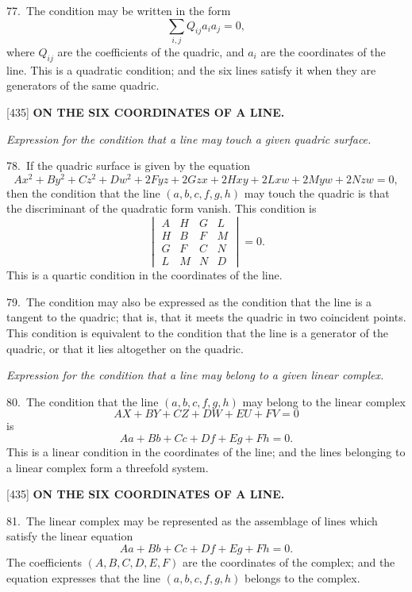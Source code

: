 \documentclass[12pt,a4paper]{article}
\newcommand{\paperref}[1]{\textup{[#1]}}
\theoremstyle{definition}
\begin{document}
77.~The condition may be written in the form
\[
\sum_{i,j} Q_{ij} a_i a_j = 0,
\]
where $Q_{ij}$ are the coefficients of the quadric, and $a_i$ are the coordinates of the line. This is a quadratic condition; and the six lines satisfy it when they are generators of the same quadric.

\newpage
\setcounter{page}{94}

\noindent\paperref{435}\quad
\textbf{ON THE SIX COORDINATES OF A LINE.}

\textit{Expression for the condition that a line may touch a given quadric surface.}

78.~If the quadric surface is given by the equation
\[
Ax^2 + By^2 + Cz^2 + Dw^2 + 2Fyz + 2Gzx + 2Hxy + 2Lxw + 2Myw + 2Nzw = 0,
\]
then the condition that the line $(a, b, c, f, g, h)$ may touch the quadric is that the discriminant of the quadratic form vanish. This condition is
\[
\begin{vmatrix}
A & H & G & L \\
H & B & F & M \\
G & F & C & N \\
L & M & N & D
\end{vmatrix}
= 0.
\]
This is a quartic condition in the coordinates of the line.

79.~The condition may also be expressed as the condition that the line is a tangent to the quadric; that is, that it meets the quadric in two coincident points. This condition is equivalent to the condition that the line is a generator of the quadric, or that it lies altogether on the quadric.

\textit{Expression for the condition that a line may belong to a given linear complex.}

80.~The condition that the line $(a, b, c, f, g, h)$ may belong to the linear complex
\[
AX + BY + CZ + DW + EU + FV = 0
\]
is
\[
Aa + Bb + Cc + Df + Eg + Fh = 0.
\]
This is a linear condition in the coordinates of the line; and the lines belonging to a linear complex form a threefold system.

\newpage
\setcounter{page}{95}

\noindent\paperref{435}\quad
\textbf{ON THE SIX COORDINATES OF A LINE.}

81.~The linear complex may be represented as the assemblage of lines which satisfy the linear equation
\[
Aa + Bb + Cc + Df + Eg + Fh = 0.
\]
The coefficients $(A, B, C, D, E, F)$ are the coordinates of the complex; and the equation expresses that the line $(a, b, c, f, g, h)$ belongs to the complex.
\end{document}
